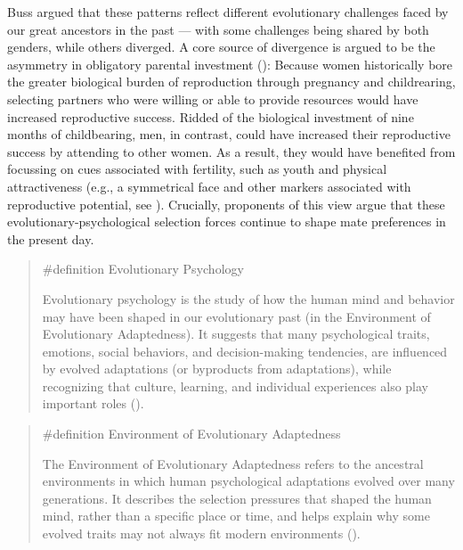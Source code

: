 \documentclass[
  letterpaper,
]{book}
\begin{document}
Buss argued that these patterns reflect different evolutionary
challenges faced by our great ancestors in the past --- with some
challenges being shared by both genders, while others diverged. A core
source of divergence is argued to be the asymmetry in obligatory
parental investment (): Because women historically bore the greater biological burden of
reproduction through pregnancy and childrearing, selecting partners who
were willing or able to provide resources would have increased
reproductive success. Ridded of the biological investment of nine months
of childbearing, men, in contrast, could have increased their
reproductive success by attending to other women. As a result, they
would have benefited from focussing on cues associated with fertility,
such as youth and physical attractiveness (e.g., a symmetrical face and
other markers associated with reproductive potential, see
).
Crucially, proponents of this view argue that these
evolutionary-psychological selection forces continue to shape mate
preferences in the present day.

\begin{quote}
\label{def-evolutionarypsychology}{\#definition}
Evolutionary Psychology

Evolutionary psychology is the study of how the human mind and behavior
may have been shaped in our evolutionary past (in the Environment of
Evolutionary Adaptedness). It suggests that many psychological traits,
emotions, social behaviors, and decision-making tendencies, are
influenced by evolved adaptations (or byproducts from adaptations),
while recognizing that culture, learning, and individual experiences
also play important roles ().
\end{quote}

\begin{quote}
\label{def-environmentofevolutionaryadaptedness}{\#definition}
Environment of Evolutionary Adaptedness

The Environment of Evolutionary Adaptedness refers to the ancestral
environments in which human psychological adaptations evolved over many
generations. It describes the selection pressures that shaped the human
mind, rather than a specific place or time, and helps explain why some
evolved traits may not always fit modern environments
().
\end{quote}
\end{document}
